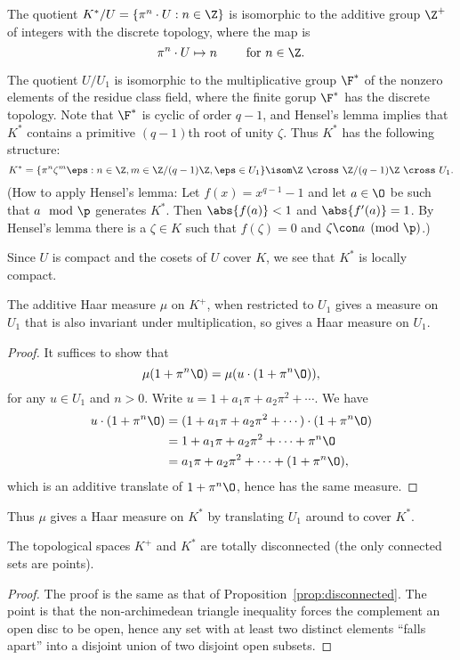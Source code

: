   The quotient $K^*/U = \{ \pi^n \cdot U : n \in \Z\}$ is isomorphic to the additive group $\Z^+$
of integers with the discrete topology, where the map is 
$$
 \pi^n\cdot U \mapsto n  \qquad \text{ for } n\in\Z.
 $$

The quotient
 $U/U_1$ is isomorphic to the multiplicative group $\F^*$ of the
 nonzero elements of the residue class field, where the finite gorup
 $\F^*$ has the discrete topology.  
Note that $\F^*$ is cyclic
 of order $q-1$, and Hensel's lemma implies that $K^*$ contains a
 primitive $(q-1)$th root of unity $\zeta$.  Thus $K^*$ has
the following structure:
$$
K^* = \{ \pi^n\zeta^m\eps : n\in \Z, m\in\Z/(q-1)\Z, \eps\in U_1\}
\isom \Z\,\, \cross\,\, \Z/(q-1)\Z \,\,\cross\,\, U_1.
$$
(How to apply Hensel's lemma: Let $f(x) = x^{q-1}-1$ and let
$a\in\O$ be such that $a\mod\p$ generates $K^*$.  Then $\abs{f(a)}<1$
and $\abs{f'(a)}=1$.  By Hensel's lemma  there is a
$\zeta\in K$ such that $f(\zeta)=0$ and $\zeta\con a\pmod{\p}$.)

Since $U$ is compact and the cosets of $U$ cover $K$, we see that
$K^*$ is locally compact.  
\begin{lemma}
The additive Haar measure $\mu$ on $K^+$,
when restricted to $U_1$ gives a measure on $U_1$ that is also
invariant under multiplication, so gives a Haar measure on $U_1$.
\end{lemma}
\begin{proof}
It suffices to show that
$$\mu(1+\pi^n\O) = \mu(u\cdot(1+\pi^n\O)),$$ 
for any $u\in U_1$ and $n>0$.
Write $u=1+a_1\pi + a_2\pi^2 +\cdots$.
We have
\begin{align*}
 u\cdot (1+\pi^n\O) &= (1+a_1\pi + a_2\pi^2 +\cdots)\cdot (1+\pi^n\O)\\
  &= 1+a_1\pi + a_2\pi^2 + \cdots + \pi^n\O\\
  &= a_1\pi + a_2\pi^2 + \cdots + ( 1+\pi^n\O),
\end{align*}
which is an additive translate of $1+\pi^n\O$, hence has the
same measure. 
\end{proof}
Thus $\mu$ gives a Haar measure on $K^*$ by translating $U_1$ around
to cover $K^*$.

\begin{lemma}
The topological spaces $K^+$ and $K^*$ are totally disconnected (the
only connected sets are points).
\end{lemma}
\begin{proof}
  The proof is the same as that of
  Proposition~\ref{prop:disconnected}.  The point is that the
  non-archimedean triangle inequality forces the complement an open
  disc to be open, hence any set with at least two distinct elements
  ``falls apart'' into a disjoint union of two disjoint open subsets.
\end{proof}

